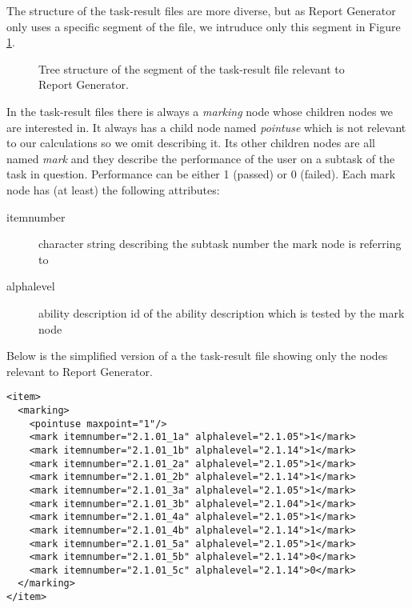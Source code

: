 \documentclass{scrartcl}
\begin{document}
The structure of the task-result files are more diverse, but as Report Generator only uses a specific segment of the file, we intruduce only this segment in Figure \ref{fig:taskresult}.
\begin{figure}
\begin{center}
\end{center}
\caption{Tree structure of the segment of the task-result file relevant to Report Generator.}
\label{fig:taskresult}
\end{figure}
In the task-result files there is always a \emph{marking} node whose children nodes we are interested in. It always has a child node named \emph{pointuse} which is not relevant to our calculations so we omit describing it. Its other children nodes are all named \emph{mark} and they describe the performance of the user on a subtask of the task in question. Performance can be either 1 (passed) or 0 (failed). Each mark node has (at least) the following attributes:
\begin{description}
\item[itemnumber] character string describing the subtask number the mark node is referring to
\item[alphalevel] ability description id of the ability description which is tested by the mark node
\end{description} 
Below is the simplified version of a the task-result file showing only the nodes relevant to Report Generator.
\begin{verbatim}
<item>
  <marking>
    <pointuse maxpoint="1"/>
    <mark itemnumber="2.1.01_1a" alphalevel="2.1.05">1</mark>
    <mark itemnumber="2.1.01_1b" alphalevel="2.1.14">1</mark>
    <mark itemnumber="2.1.01_2a" alphalevel="2.1.05">1</mark>
    <mark itemnumber="2.1.01_2b" alphalevel="2.1.14">1</mark>
    <mark itemnumber="2.1.01_3a" alphalevel="2.1.05">1</mark>
    <mark itemnumber="2.1.01_3b" alphalevel="2.1.04">1</mark>
    <mark itemnumber="2.1.01_4a" alphalevel="2.1.05">1</mark>
    <mark itemnumber="2.1.01_4b" alphalevel="2.1.14">1</mark>
    <mark itemnumber="2.1.01_5a" alphalevel="2.1.05">1</mark>
    <mark itemnumber="2.1.01_5b" alphalevel="2.1.14">0</mark>
    <mark itemnumber="2.1.01_5c" alphalevel="2.1.14">0</mark>
  </marking>
</item>
\end{verbatim}
\end{document}
